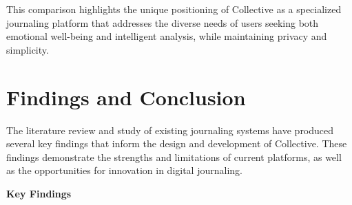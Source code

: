This comparison highlights the unique positioning of Collective as a specialized journaling platform that addresses the diverse needs of users seeking both emotional well-being and intelligent analysis, while maintaining privacy and simplicity.

\section{Findings and Conclusion}\label{sec:findings}

The literature review and study of existing journaling systems have produced several key findings that inform the design and development of Collective. These findings demonstrate the strengths and limitations of current platforms, as well as the opportunities for innovation in digital journaling.

\textbf{Key Findings}

